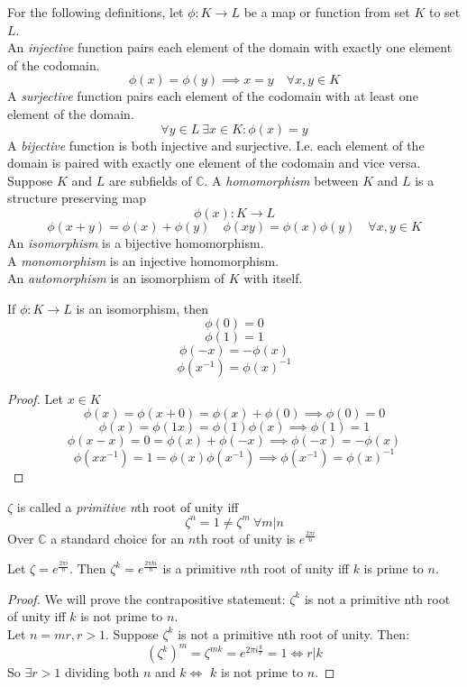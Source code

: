 \begin{definition}
    For the following definitions, let $\phi : K \to L$ be a map or function from set $K$ to set $L$.\\
    An \textit{injective} function pairs each element of the domain with exactly one element of the codomain.
    \[\phi(x) = \phi(y) \implies x = y \quad \forall x,y \in K\]
    A \textit{surjective} function pairs each element of the codomain with at least one element of the domain.
    \[\forall y \in L \ \exists x \in K : \phi(x) = y\]
    A \textit{bijective} function is both injective and surjective. 
    I.e. each element of the domain is paired with exactly one element of the codomain and vice versa.\\
    Suppose $K$ and $L$ are subfields of $\mathbb{C}$.
    A \textit{homomorphism} between $K$ and $L$ is a structure preserving map
    \[\phi(x) : K \to L\]
    \begin{equation*}\label{definition: homomorphism}
        \phi(x + y) = \phi(x) + \phi(y) \quad \phi(xy) = \phi(x)\phi(y) \quad \forall x,y \in K
    \end{equation*}
    An \textit{isomorphism} is a bijective homomorphism.\\
    A \textit{monomorphism} is an injective homomorphism.\\
    An \textit{automorphism} is an isomorphism of $K$ with itself.
\end{definition}

\begin{proposition}
    If $\phi : K \to L$ is an isomorphism, then
    \[\phi(0) = 0\]
    \[\phi(1) = 1\]
    \[\phi(-x) = -\phi(x)\]
    \[\phi(x^{-1}) = \phi(x)^{-1}\] 
\end{proposition}
\begin{proof}
    Let $x \in K$
    \[\phi(x) = \phi(x + 0) = \phi(x) + \phi(0) \implies \phi(0) = 0\]
    \[\phi(x) = \phi(1x) = \phi(1)\phi(x) \implies \phi(1) = 1\]
    \[\phi(x - x) = 0 = \phi(x) + \phi(-x) \implies \phi(-x) = -\phi(x)\]
    \[\phi(xx^{-1}) = 1 = \phi(x)\phi(x^{-1}) \implies \phi(x^{-1}) = \phi(x)^{-1}\]
\end{proof}

\begin{definition}
    $\zeta$ is called a \textit{primitive n}th root of unity iff
    \[\zeta^n = 1 \neq \zeta^m\ \forall m|n\]
    Over $\mathbb{C}$ a standard choice for an $n$th root of unity is $e^{\frac{2\pi i}{n}}$
\end{definition}

\begin{proposition}
    Let $\zeta = e^{\frac{2\pi i}{n}}$. Then $\zeta^k = e^{\frac{2\pi ki}{n}}$ is a primitive $n$th root of unity
    iff $k$ is prime to $n$.
\end{proposition}
\begin{proof}
    We will prove the contrapositive statement: $\zeta^k$ is not a primitive nth root of unity iff $k$ is not prime to $n$.\\
    Let $n = mr, r > 1$. Suppose $\zeta^k$ is not a primitive nth root of unity. Then:
    \[(\zeta^k)^m = \zeta^{mk} = e^{2\pi i\frac{k}{r}} = 1 \iff r|k\]
    So $\exists r > 1$ dividing both $n$ and $k \iff$ $k$ is not prime to $n$.
\end{proof}